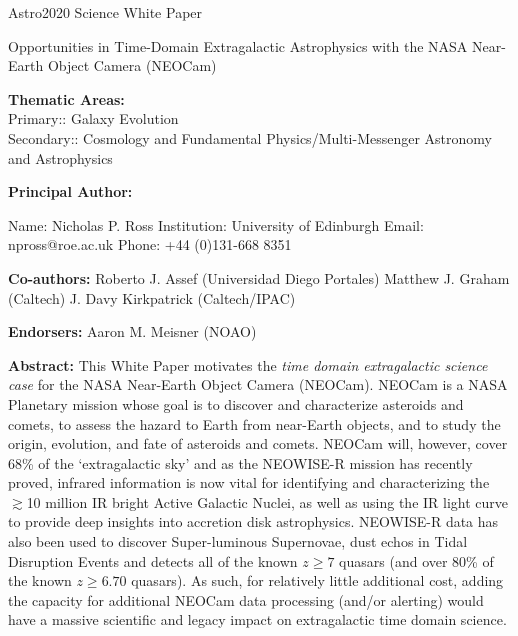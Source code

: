 \documentclass[12pt]{article}
\begin{document}
\raggedright
\huge
Astro2020 Science White Paper \linebreak

\textcolor{Cerulean}{Opportunities in Time-Domain Extragalactic Astrophysics with the NASA
Near-Earth Object Camera (NEOCam)}
\normalsize
\linebreak \linebreak 

\noindent \textbf{Thematic Areas:} \\
Primary:: Galaxy Evolution  \\
Secondary:: Cosmology and Fundamental Physics/Multi-Messenger Astronomy and Astrophysics 
\linebreak
  
\textbf{Principal Author:}

Name: Nicholas P. Ross	
 \linebreak						
Institution:  University of Edinburgh
 \linebreak
Email: npross@roe.ac.uk
 \linebreak
Phone:  +44 (0)131-668 8351
 \linebreak
 
\textbf{Co-authors:} %
  \linebreak
Roberto J. Assef (Universidad Diego Portales)   \linebreak
Matthew J. Graham (Caltech) \linebreak 
J. Davy Kirkpatrick (Caltech/IPAC) \linebreak


\textbf{Endorsers:} %
 \linebreak
Aaron M. Meisner (NOAO) 
\linebreak

\justify
\textbf{Abstract:}
This White Paper motivates the {\it time domain extragalactic science
case} for the NASA Near-Earth Object Camera (NEOCam). NEOCam is a NASA
Planetary mission whose goal is to discover and characterize asteroids
and comets, to assess the hazard to Earth from near-Earth objects, and
to study the origin, evolution, and fate of asteroids and
comets. NEOCam will, however, cover 68\% of the `extragalactic sky'
and as the NEOWISE-R mission has recently proved, infrared information
is now vital for identifying and characterizing the $\gtrsim$10
million IR bright Active Galactic Nuclei, as well as using the IR
light curve to provide deep insights into accretion disk
astrophysics. NEOWISE-R data has also been used to discover
Super-luminous Supernovae, dust echos in Tidal Disruption Events and
detects all of the known $z\geq7$ quasars (and over 80\% of the known
$z\geq6.70$ quasars). As such, for relatively little additional cost,
adding the capacity for additional NEOCam data processing (and/or
alerting) would have a massive scientific and legacy impact on
extragalactic time domain science.
\end{document}
